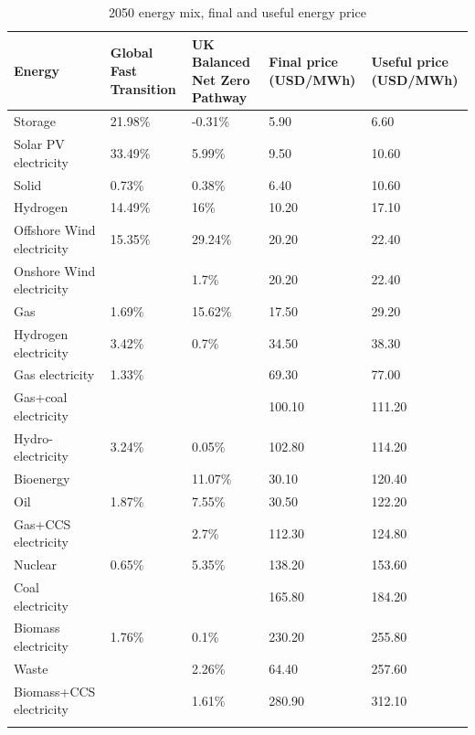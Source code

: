 \begin{longtable}{P{5cm}P{3cm}P{2cm}P{3cm}P{3cm}}
\caption{2050 energy mix, final and useful energy price} \\ 
  \hline
Energy & Global Fast Transition & UK Balanced Net Zero Pathway & Final price (USD/MWh) & Useful price (USD/MWh) \\ 
  \hline
Storage & 21.98\% & -0.31\% & 5.90 & 6.60 \\ 
  Solar PV electricity & 33.49\% & 5.99\% & 9.50 & 10.60 \\ 
  Solid & 0.73\% & 0.38\% & 6.40 & 10.60 \\ 
  Hydrogen & 14.49\% & 16\% & 10.20 & 17.10 \\ 
  Offshore Wind electricity & 15.35\% & 29.24\% & 20.20 & 22.40 \\ 
  Onshore Wind electricity &  & 1.7\% & 20.20 & 22.40 \\ 
  Gas & 1.69\% & 15.62\% & 17.50 & 29.20 \\ 
  Hydrogen electricity & 3.42\% & 0.7\% & 34.50 & 38.30 \\ 
  Gas electricity & 1.33\% &  & 69.30 & 77.00 \\ 
  Gas+coal electricity &  &  & 100.10 & 111.20 \\ 
  Hydro-electricity & 3.24\% & 0.05\% & 102.80 & 114.20 \\ 
  Bioenergy &  & 11.07\% & 30.10 & 120.40 \\ 
  Oil & 1.87\% & 7.55\% & 30.50 & 122.20 \\ 
  Gas+CCS electricity &  & 2.7\% & 112.30 & 124.80 \\ 
  Nuclear & 0.65\% & 5.35\% & 138.20 & 153.60 \\ 
  Coal electricity &  &  & 165.80 & 184.20 \\ 
  Biomass electricity & 1.76\% & 0.1\% & 230.20 & 255.80 \\ 
  Waste &  & 2.26\% & 64.40 & 257.60 \\ 
  Biomass+CCS electricity &  & 1.61\% & 280.90 & 312.10 \\ 
   \hline
\hline
\label{tab_final_price_energy}
\end{longtable}
